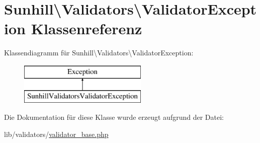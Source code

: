 \hypertarget{classSunhill_1_1Validators_1_1ValidatorException}{}\section{Sunhill\textbackslash{}Validators\textbackslash{}Validator\+Exception Klassenreferenz}
\label{classSunhill_1_1Validators_1_1ValidatorException}
Klassendiagramm für Sunhill\textbackslash{}Validators\textbackslash{}Validator\+Exception\+:\begin{figure}[H]
\begin{center}
\leavevmode
\includegraphics[height=2.000000cm]{d0/dcc/classSunhill_1_1Validators_1_1ValidatorException}
\end{center}
\end{figure}


Die Dokumentation für diese Klasse wurde erzeugt aufgrund der Datei\+:\begin{DoxyCompactItemize}
\item 
lib/validators/\hyperlink{validator__base_8php}{validator\+\_\+base.\+php}\end{DoxyCompactItemize}

